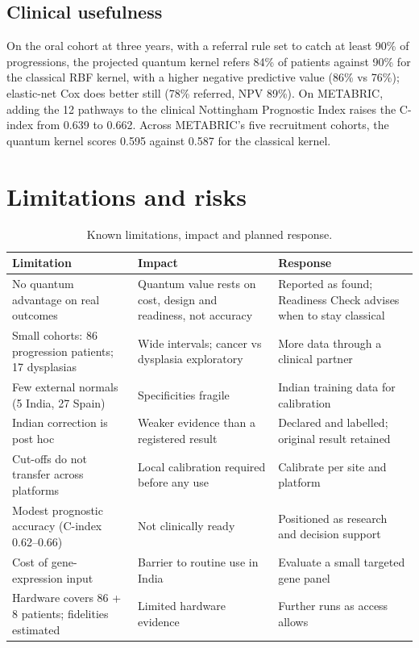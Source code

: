 \documentclass[11pt,a4paper]{article}
\begin{document}
\subsection{Clinical usefulness}
On the oral cohort at three years, with a referral rule set to catch at least 90\% of progressions, the projected quantum kernel refers 84\% of patients against 90\% for the classical RBF kernel, with a higher negative predictive value (86\% vs 76\%); elastic-net Cox does better still (78\% referred, NPV 89\%). On METABRIC, adding the 12 pathways to the clinical Nottingham Prognostic Index raises the C-index from 0.639 to 0.662. Across METABRIC's five recruitment cohorts, the quantum kernel scores 0.595 against 0.587 for the classical kernel.

\section{Limitations and risks}
\begin{table}[H]
\centering
\caption{Known limitations, impact and planned response.}
\small
\begin{tabularx}{\textwidth}{@{}Y Y Y@{}}
\toprule
\textbf{Limitation} & \textbf{Impact} & \textbf{Response} \\
\midrule
No quantum advantage on real outcomes & Quantum value rests on cost, design and readiness, not accuracy & Reported as found; Readiness Check advises when to stay classical \\
Small cohorts: 86 progression patients; 17 dysplasias & Wide intervals; cancer vs dysplasia exploratory & More data through a clinical partner \\
Few external normals (5 India, 27 Spain) & Specificities fragile & Indian training data for calibration \\
Indian correction is post hoc & Weaker evidence than a registered result & Declared and labelled; original result retained \\
Cut-offs do not transfer across platforms & Local calibration required before any use & Calibrate per site and platform \\
Modest prognostic accuracy (C-index 0.62--0.66) & Not clinically ready & Positioned as research and decision support \\
Cost of gene-expression input & Barrier to routine use in India & Evaluate a small targeted gene panel \\
Hardware covers 86 + 8 patients; fidelities estimated & Limited hardware evidence & Further runs as access allows \\
\bottomrule
\end{tabularx}
\end{table}
\end{document}
